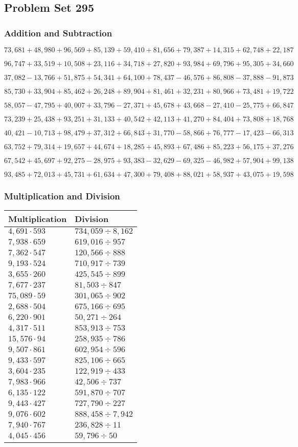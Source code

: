 \hypertarget{problem-set-295}{%
\subsection{Problem Set 295}\label{problem-set-295}}

\hypertarget{addition-and-subtraction}{%
\subsubsection{Addition and
Subtraction}\label{addition-and-subtraction}}

\(73,681+48,980+96,569+85,139+59,410+81,656+79,387+14,315+62,748+22,187\)

\(96,747+33,519+10,508+23,116+34,718+27,820+93,984+69,796+95,305+34,660\)

\(37,082-13,766+51,875+54,341+64,100+78,437-46,576+86,808-37,888-91,873\)

\(85,730+33,904+85,462+26,248+89,904+81,461+32,231+80,966+73,481+19,722\)

\(58,057-47,795+40,007+33,796-27,371+45,678+43,668-27,410-25,775+66,847\)

\(73,239+25,438+93,251+31,133+40,542+42,113+41,270+84,404+73,808+18,768\)

\(40,421-10,713+98,479+37,312+66,843+31,770-58,866+76,777-17,423-66,313\)

\(63,752+79,314+19,657+44,674+18,285+45,893+67,486+85,223+56,175+37,276\)

\(67,542+45,697+92,275-28,975+93,383-32,629-69,325-46,982+57,904+99,138\)

\(93,485+72,013+45,731+61,634+47,300+79,408+88,021+58,937+43,075+19,598\)

\hypertarget{multiplication-and-division}{%
\subsubsection{Multiplication and
Division}\label{multiplication-and-division}}

\begin{longtable}[]{@{}ll@{}}
\toprule
Multiplication & Division\tabularnewline
\midrule
\endhead
\(4,691\cdot593\) & \(734,059÷8,162\)\tabularnewline
\(7,938\cdot659\) & \(619,016÷957\)\tabularnewline
\(7,362\cdot547\) & \(120,566÷888\)\tabularnewline
\(9,193\cdot524\) & \(710,917÷739\)\tabularnewline
\(3,655\cdot260\) & \(425,545÷899\)\tabularnewline
\(7,677\cdot237\) & \(81,503÷847\)\tabularnewline
\(75,089\cdot59\) & \(301,065÷902\)\tabularnewline
\(2,688\cdot504\) & \(675,166÷695\)\tabularnewline
\(6,220\cdot901\) & \(50,271÷264\)\tabularnewline
\(4,317\cdot511\) & \(853,913÷753\)\tabularnewline
\(15,576\cdot94\) & \(258,935÷786\)\tabularnewline
\(9,507\cdot861\) & \(602,954÷596\)\tabularnewline
\(9,433\cdot597\) & \(825,106÷665\)\tabularnewline
\(3,604\cdot235\) & \(122,919÷433\)\tabularnewline
\(7,983\cdot966\) & \(42,506÷737\)\tabularnewline
\(6,135\cdot122\) & \(591,870÷707\)\tabularnewline
\(9,443\cdot427\) & \(727,790÷227\)\tabularnewline
\(9,076\cdot602\) & \(888,458÷7,942\)\tabularnewline
\(7,940\cdot767\) & \(236,828÷11\)\tabularnewline
\(4,045\cdot456\) & \(59,796÷50\)\tabularnewline
\bottomrule
\end{longtable}
